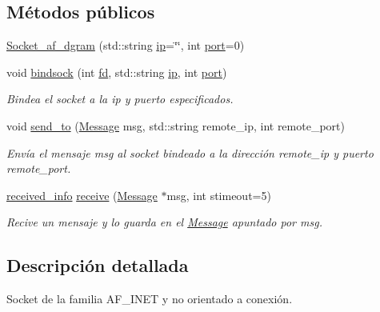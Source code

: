 \subsection*{Métodos públicos}
\begin{DoxyCompactItemize}
\item 
\hyperlink{classSocket__af__dgram_a41bd41eb63d780e446275dc5eb320334}{Socket\+\_\+af\+\_\+dgram} (std\+::string \hyperlink{classSocket__base_aed490170422026c6dfe5def12031cd04}{ip}=\char`\"{}\char`\"{}, int \hyperlink{classSocket__base_afcdd7ae81a9fb867d012b7db8c259576}{port}=0)
\item 
void \hyperlink{classSocket__af__dgram_a6a2084d50ab117b0bf6b699aa0573db5}{bindsock} (int \hyperlink{classSocket__base_a740aedbac3269e4981732dd6842cd9c2}{fd}, std\+::string \hyperlink{classSocket__base_aed490170422026c6dfe5def12031cd04}{ip}, int \hyperlink{classSocket__base_afcdd7ae81a9fb867d012b7db8c259576}{port})
\begin{DoxyCompactList}\small\item\em Bindea el socket a la ip y puerto especificados. \end{DoxyCompactList}\item 
void \hyperlink{classSocket__af__dgram_a744bb661eeebe5b5cdfca0028da6bd88}{send\+\_\+to} (\hyperlink{structMessage}{Message} msg, std\+::string remote\+\_\+ip, int remote\+\_\+port)
\begin{DoxyCompactList}\small\item\em Envía el mensaje {\itshape msg} al socket bindeado a la dirección {\itshape remote\+\_\+ip} y puerto {\itshape remote\+\_\+port}. \end{DoxyCompactList}\item 
\hyperlink{structreceived__info}{received\+\_\+info} \hyperlink{classSocket__af__dgram_ac7d122d2317d980c48964076c3c7e2bb}{receive} (\hyperlink{structMessage}{Message} $\ast$msg, int stimeout=5)
\begin{DoxyCompactList}\small\item\em Recive un mensaje y lo guarda en el \hyperlink{structMessage}{Message} apuntado por {\itshape msg}. \end{DoxyCompactList}\end{DoxyCompactItemize}


\subsection{Descripción detallada}
Socket de la familia A\+F\+\_\+\+I\+N\+ET y no orientado a conexión. 

